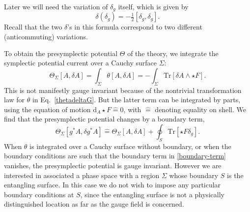 \documentclass[a4paper,11pt]{article}
\def\rd{\mathrm{d}}
\newcommand{\hateq}{\mathrel{\hat{=}}}
\newcommand{\Tr}{\mbox{Tr}}
\begin{document}
Later we will need the variation of $\delta_g$ itself, which is given by
\begin{equation} \label{deltadeltag}
\delta (\delta_g) = -\tfrac12 [\delta_g, \delta_g].
\end{equation}
Recall that the two $\delta$'s in this formula correspond to two different (anticommuting) variations.

To obtain the presymplectic potential $\Theta$ of the theory, we integrate the symplectic potential current over a Cauchy surface $\Sigma$:
\begin{equation} \label{YMtheta}
\Theta_\Sigma[A, \delta A] = \int_\Sigma \theta[A, \delta A ]= -\int_\Sigma \Tr\left[  \delta A \wedge\star F\right].
\end{equation}
This is not manifestly gauge invariant because of the nontrivial transformation law for $\theta$ in Eq.~\eqref{thetadeltaG}.
But the latter term can be integrated by parts, using the equation of motion $\rd_A{\star }F \hateq 0$, with $\hateq$ denoting equality on shell.
We find that the presymplectic potential changes by a boundary term,
\begin{equation} \label{boundary-term}
\Theta_\Sigma[g^*A, \delta g^* A] \hateq \Theta_\Sigma[A, \delta A] + \oint_S \Tr[\star F \delta_g].
\end{equation}
When $\theta$ is integrated over a Cauchy surface without boundary, or when the boundary conditions are such that the boundary term in \eqref{boundary-term} vanishes, the presymplectic potential is gauge invariant.
However we are interested in associated a phase space with a region $\Sigma$ whose boundary $S$ is the entangling surface.
In this case we do not wish to impose any particular boundary conditions at $S$, since the entangling surface is not a physically distinguished location as far as the gauge field is concerned.
\end{document}
